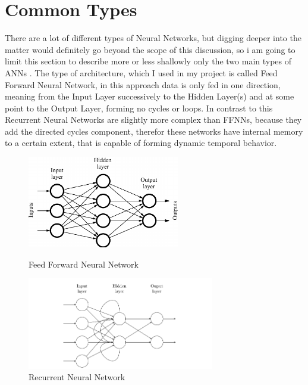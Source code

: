 \section{Common Types}
There are a lot of different types of Neural Networks, but digging deeper into the matter would definitely go beyond the scope of this discussion, so i am going to limit this section to describe more or less shallowly only the two main types of ANNs \cite{nntutorial}.\newline
The type of architecture, which I used in my project is called Feed Forward Neural Network, in this approach data is only fed in one direction, meaning from the Input Layer successively to the Hidden Layer(s) and at some point to the Output Layer, forming no cycles or loops. \newline
In contrast to this Recurrent Neural Networks are slightly more complex than FFNNs, because they add the directed cycles component, therefor these networks have internal memory to a certain extent, that is capable of forming dynamic temporal behavior.


\begin{figure}[H]
	
	\includegraphics[height=4cm]{images/feed_forward_neural_net.png}
	\caption{Feed Forward Neural Network \cite{ffnn}}
	\label{fig:ff_neural_net}
	\endminipage
	\hfill
	\includegraphics[height=4cm]{images/recurrent_neural_net.png}
	\caption{Recurrent Neural Network \cite{rnn}}
	\label{fig:rec_neural_net}
	\endminipage
\end{figure}


